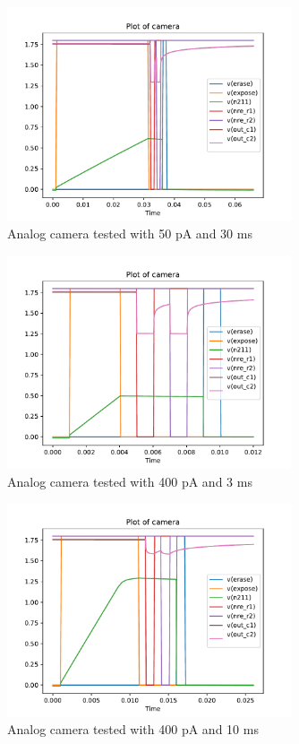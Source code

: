 \begin{figure}[H]
  \centering
  \includegraphics[width=0.75\textwidth]{../analog/camera5030}
  \caption{Analog camera tested with 50 pA and 30 ms}
  \label{fig:analog5030}
\end{figure}

\begin{figure}[H]
  \centering
  \includegraphics[width=0.75\textwidth]{../analog/camera4003typical}
  \caption{Analog camera tested with 400 pA and 3 ms}
  \label{fig:analog4003}
\end{figure}

\begin{figure}[H]
  \centering
  \includegraphics[width=0.75\textwidth]{../analog/camera40010overexposed}
  \caption{Analog camera tested with 400 pA and 10 ms}
  \label{fig:analog40010}
\end{figure}


